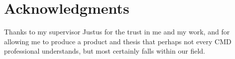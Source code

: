 
\begingroup
\let\clearpage\relax
\let\cleardoublepage\relax
\let\cleardoublepage\relax
\chapter*{Acknowledgments}

Thanks to my supervisor Justus for the trust in me and my work, and for
allowing me to produce a product and thesis that perhaps not every CMD
professional understands, but most certainly falls within our field.

\endgroup
